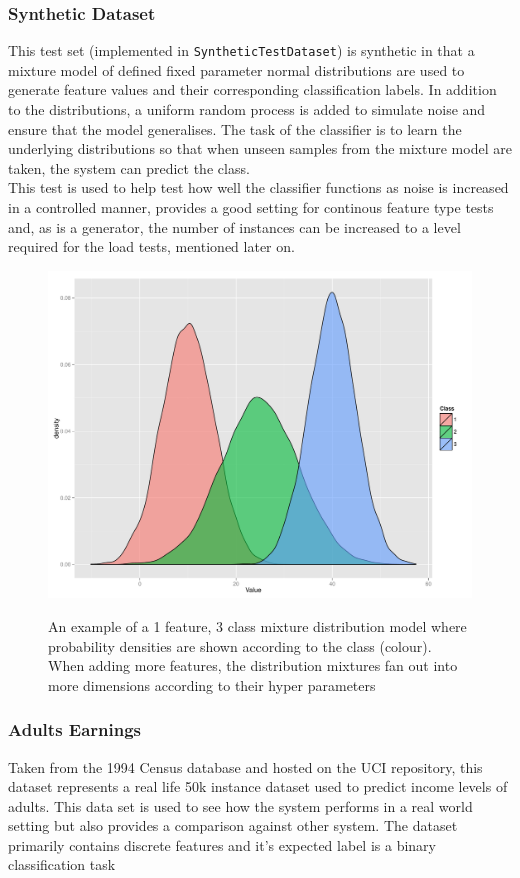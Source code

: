 \documentclass[a4paper,11pt]{scrreprt}
\begin{document}
\subsubsection{Synthetic Dataset}
This test set (implemented in \verb|SyntheticTestDataset|) is synthetic in that a mixture model of defined fixed parameter normal distributions are used to generate feature values and their corresponding classification labels. In addition to the distributions, a uniform random process is added to simulate noise and ensure that the model generalises. The task of the classifier is to learn the underlying distributions so that when unseen samples from the mixture model are taken, the system can predict the class.\\ This test is used to help test how well the classifier functions as noise is increased in a controlled manner, provides a good setting for continous feature type tests and, as is a generator, the number of instances can be increased to a level required for the load tests, mentioned later on.
\begin{figure}[h!]
\centering
\caption{An example of a 1 feature, 3 class mixture distribution model where probability densities are shown according to the class (colour). When adding more features, the distribution mixtures fan out into more dimensions according to their hyper parameters}
\includegraphics[scale=0.35, trim=0 0 0 0, clip=true] {synthetic-class-distributions.pdf}
\label{fig:indexes}
\end{figure}
\subsubsection{Adults Earnings} 
Taken from the 1994 Census database and hosted on the UCI repository, this dataset represents a real life 50k instance dataset used to predict income levels of adults. This data set is used to see how the system performs in a real world setting but also provides a comparison against other system. The dataset primarily contains discrete features and it's expected label is a binary classification task
\end{document}
